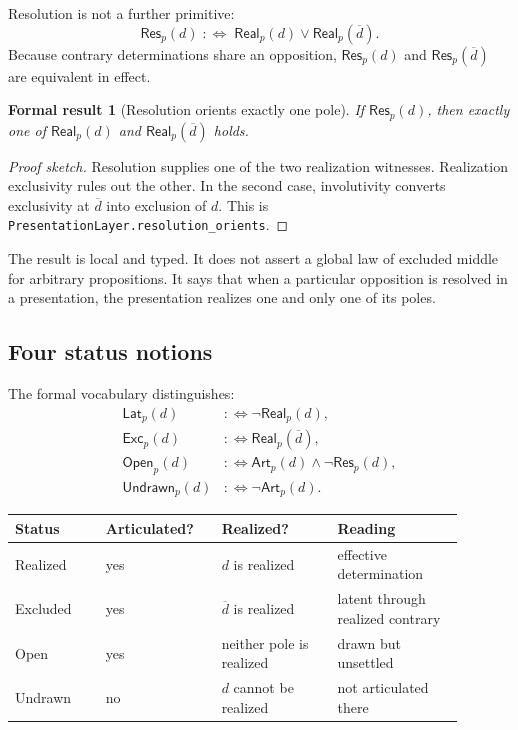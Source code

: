 \documentclass[11pt]{article}
\newtheorem{formalresult}{Formal result}[section]
\theoremstyle{definition}
\theoremstyle{remark}
\newcommand{\lean}[1]{\nolinkurl{#1}}
\newcommand{\Art}{\mathsf{Art}}
\newcommand{\Real}{\mathsf{Real}}
\newcommand{\Res}{\mathsf{Res}}
\newcommand{\Lat}{\mathsf{Lat}}
\newcommand{\Exc}{\mathsf{Exc}}
\newcommand{\Opn}{\mathsf{Open}}
\newcommand{\Und}{\mathsf{Undrawn}}
\newcommand{\negd}[1]{\overline{#1}}
\begin{document}
Resolution is not a further primitive:
\[
  \Res_p(d)\;:\!\!\Longleftrightarrow\;
  \Real_p(d)\lor\Real_p(\negd d).
\]
Because contrary determinations share an opposition,
\(\Res_p(d)\) and \(\Res_p(\negd d)\) are equivalent in effect.

\begin{formalresult}[Resolution orients exactly one pole]
If \(\Res_p(d)\), then exactly one of \(\Real_p(d)\) and
\(\Real_p(\negd d)\) holds.
\end{formalresult}

\begin{proof}[Proof sketch]
Resolution supplies one of the two realization witnesses. Realization
exclusivity rules out the other. In the second case, involutivity converts
exclusivity at \(\negd d\) into exclusion of \(d\). This is
\lean{PresentationLayer.resolution_orients}.
\end{proof}

The result is local and typed. It does not assert a global law of excluded
middle for arbitrary propositions. It says that when a particular
opposition is resolved in a presentation, the presentation realizes one and
only one of its poles.

\subsection{Four status notions}

The formal vocabulary distinguishes:
\begin{align*}
  \Lat_p(d) &:\!\!\Longleftrightarrow \neg\Real_p(d),\\
  \Exc_p(d) &:\!\!\Longleftrightarrow \Real_p(\negd d),\\
  \Opn_p(d) &:\!\!\Longleftrightarrow
     \Art_p(d)\land\neg\Res_p(d),\\
  \Und_p(d) &:\!\!\Longleftrightarrow \neg\Art_p(d).
\end{align*}

\begin{center}
\small
\begin{tabular}{@{}p{0.18\linewidth}p{0.23\linewidth}p{0.23\linewidth}p{0.25\linewidth}@{}}
\toprule
Status & Articulated? & Realized? & Reading \\
\midrule
Realized & yes & \(d\) is realized & effective determination \\
Excluded & yes & \(\negd d\) is realized & latent through realized contrary \\
Open & yes & neither pole is realized & drawn but unsettled \\
Undrawn & no & \(d\) cannot be realized & not articulated there \\
\bottomrule
\end{tabular}
\end{center}
\end{document}
